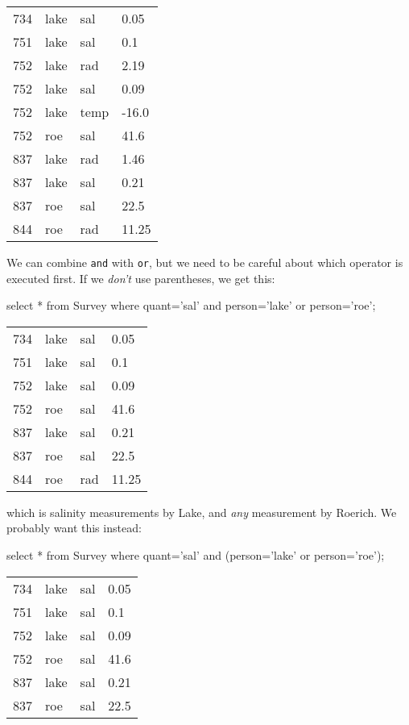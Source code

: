 \documentclass{book}
\begin{document}
\begin{tabular}{llll}
734 & lake & sal & 0.05 \\
751 & lake & sal & 0.1 \\
752 & lake & rad & 2.19 \\
752 & lake & sal & 0.09 \\
752 & lake & temp & -16.0 \\
752 & roe & sal & 41.6 \\
837 & lake & rad & 1.46 \\
837 & lake & sal & 0.21 \\
837 & roe & sal & 22.5 \\
844 & roe & rad & 11.25 \\
\end{tabular}

We can combine \texttt{and} with \texttt{or}, but we need to be careful
about which operator is executed first. If we \emph{don't} use
parentheses, we get this:

\begin{VerbIn}
select * from Survey where quant='sal' and person='lake' or person='roe';
\end{VerbIn}

\begin{tabular}{llll}
734 & lake & sal & 0.05 \\
751 & lake & sal & 0.1 \\
752 & lake & sal & 0.09 \\
752 & roe & sal & 41.6 \\
837 & lake & sal & 0.21 \\
837 & roe & sal & 22.5 \\
844 & roe & rad & 11.25 \\
\end{tabular}

which is salinity measurements by Lake, and \emph{any} measurement by
Roerich. We probably want this instead:

\begin{VerbIn}
select * from Survey where quant='sal' and (person='lake' or person='roe');
\end{VerbIn}

\begin{tabular}{llll}
734 & lake & sal & 0.05 \\
751 & lake & sal & 0.1 \\
752 & lake & sal & 0.09 \\
752 & roe & sal & 41.6 \\
837 & lake & sal & 0.21 \\
837 & roe & sal & 22.5 \\
\end{tabular}
\end{document}
